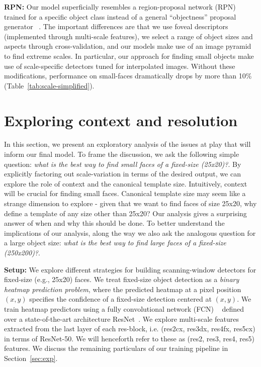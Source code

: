 \documentclass[10pt,twocolumn,letterpaper]{article}
\begin{document}
{\bf RPN: } Our model superficially resembles a region-proposal network (RPN) trained for a specific object class instead of a general ``objectness'' proposal generator ~\cite{ren2015faster}. The important differences are that we use foveal descriptors (implemented through multi-scale features), we select a range of object sizes and aspects through cross-validation, and our models make use of an image pyramid to find extreme scales. In particular, our approach for finding small objects make use of scale-specific detectors tuned for interpolated images. Without these modifications, performance on small-faces dramatically drops by more than 10\% (Table~\ref{tab:scale-simplified}).





\section{Exploring context and resolution}
\label{sec:case}

In this section, we present an exploratory analysis of the issues at play that will inform our final model. To frame the discussion, we ask the following simple question: {\em what is the best way to find small faces of a fixed-size (25x20)?}. By explicitly factoring out scale-variation in terms of the desired output, we can explore the role of context and the canonical template size. Intuitively, context will be crucial for finding small faces. Canonical template size may seem like a strange dimension to explore - given that we want to find faces of size 25x20, why define a template of any size other than 25x20? Our analysis gives a surprising answer of when and why this should be done. To better understand the implications of our analysis, along the way we also ask the analogous question for a large object size: {\em what is the best way to find large faces of a fixed-size (250x200)?}.

{\bf Setup:} We explore different strategies for building scanning-window detectors for  fixed-size (e.g., 25x20) faces. We treat fixed-size object detection as a {\em binary heatmap prediction problem}, where the predicted heatmap at a pixel position $(x,y)$ specifies the confidence of a fixed-size detection centered at $(x,y)$. We train heatmap predictors using a fully convolutional network (FCN) ~\cite{long2015fully} defined over a state-of-the-art architecture ResNet~\cite{he2015deep}. We explore multi-scale features extracted from the last layer of each res-block, i.e. (res2cx, res3dx, res4fx, res5cx) in terms of ResNet-50. We will henceforth refer to these as (res2, res3, res4, res5) features. We discuss the remaining particulars of our training pipeline in Section~\ref{sec:exp}.
\end{document}
